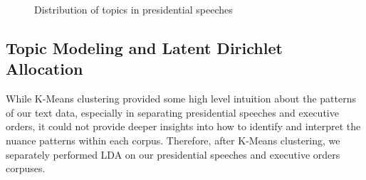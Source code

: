 \documentclass{article}
\begin{document}
{\begin{figure}[H]
	\caption{\label{fig:my-label3} Distribution of topics in presidential speeches}
\end{figure}
\subsection{Topic Modeling and Latent Dirichlet Allocation}{
While K-Means clustering provided some high level intuition about the patterns of our text data, especially in separating presidential speeches and executive orders, it could not provide deeper insights into how to identify and interpret the nuance patterns within each corpus. Therefore, after K-Means clustering, we separately performed LDA on our presidential speeches and executive orders corpuses.

}}
\end{document}
